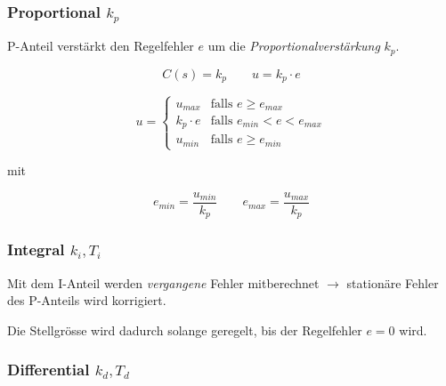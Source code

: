 \documentclass[
  10pt,
  a4paper,
  twocolumn]{article}
\numberwithin{equation}{section}
\begin{document}
\hypertarget{k_p}{%
\subsubsection{\texorpdfstring{\textcolor{BrickRed}{Proportional}
\(k_p\)}{ k\_p}}\label{k_p}}

P-Anteil verstärkt den Regelfehler \(e\) um die
\emph{Proportionalverstärkung} \(k_p\).

\[
C(s) = k_p \qquad u = k_p\cdot e
\]

\begin{tcolorbox}[enhanced jigsaw, bottomtitle=1mm, title=\textcolor{quarto-callout-important-color}{\faExclamation}\hspace{0.5em}{Proportionalband}, arc=.35mm, rightrule=.15mm, toprule=.15mm, opacitybacktitle=0.6, coltitle=black, bottomrule=.15mm, toptitle=1mm, colframe=quarto-callout-important-color-frame, colbacktitle=quarto-callout-important-color!10!white, breakable, titlerule=0mm, leftrule=.75mm, left=2mm, opacityback=0, colback=white]

\[
u = \left\{
\begin{array}{cl}
u_{max} & \text{falls } e \geq e_{max} \\
k_p\cdot e & \text{falls } e_{min} < e < e_{max} \\
u_{min} & \text{falls } e \geq e_{min}
\end{array}
\right.
\]

mit

\[
e_{min}=\frac{u_{min}}{k_p} \qquad e_{max}=\frac{u_{max}}{k_p}
\]

\end{tcolorbox}

\hypertarget{k_it_i}{%
\subsubsection{\texorpdfstring{\textcolor{NavyBlue}{Integral}
\(k_i,T_i\)}{ k\_i,T\_i}}\label{k_it_i}}

Mit dem I-Anteil werden \emph{vergangene} Fehler mitberechnet
\(\rightarrow\) stationäre Fehler des P-Anteils wird korrigiert.

Die Stellgrösse wird dadurch solange geregelt, bis der Regelfehler
\(e=0\) wird.

\hypertarget{k_dt_d}{%
\subsubsection{\texorpdfstring{\textcolor{OliveGreen}{Differential}
\(k_d,T_d\)}{ k\_d,T\_d}}\label{k_dt_d}}
\end{document}
